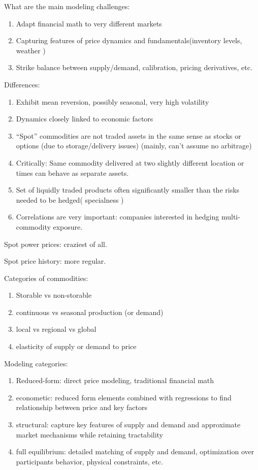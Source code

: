 \documentclass[twocolumn,openany]{book}
\begin{document}
What are the main modeling challenges:
\begin{enumerate}
	\item Adapt financial math to very different markets
	\item Capturing features of price dynamics and fundamentals(inventory levels, weather )
	\item Strike balance between supply/demand, calibration, pricing derivatives, etc.
\end{enumerate}

Differences:
\begin{enumerate}
	\item Exhibit mean reversion, possibly seasonal, very high volatility
	\item Dynamics closely linked to economic factors
	\item ``Spot'' commodities are not traded assets in the same sense as stocks or options (due to storage/delivery issues) (mainly, can't assume no arbitrage)
	\item Critically: Same commodity delivered at two slightly different location or times can behave as separate assets.
	\item Set of liquidly traded products often significantly smaller than the risks needed to be hedged( specialness ) 
	\item Correlations are very important: companies interested in hedging multi-commodity exposure.
\end{enumerate}

Spot power prices: craziest of all.

Spot price history: more regular.

Categories of commodities:
\begin{enumerate}
	\item Storable vs non-storable
	\item continuous vs seasonal production (or demand)
	\item local vs regional vs global
	\item elasticity of supply or demand to price
\end{enumerate}

Modeling categories:
\begin{enumerate}
	\item Reduced-form: direct price modeling, traditional financial math
	\item econometic: reduced form elements combined with regressions to find relationship between price and key factors
	\item structural: capture key features of supply and demand and approximate market mechanisms while retaining tractability
	\item full equilibrium: detailed matching of supply and demand, optimization over participants behavior, physical constraints, etc.
\end{enumerate}
\end{document}
